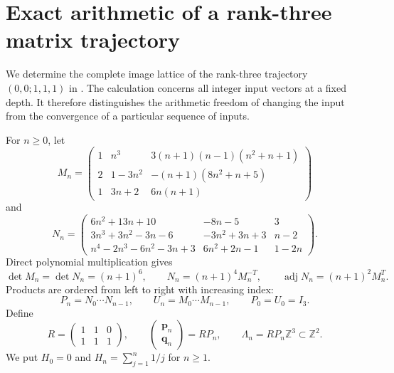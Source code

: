 \documentclass[11pt,a4paper]{article}
\theoremstyle{definition}
\theoremstyle{remark}
\newcommand{\Z}{\mathbb Z}
\numberwithin{equation}{section}
\begin{document}
\section{Exact arithmetic of a rank-three matrix trajectory}
\label{p7:sec:lattice}

We determine the complete image lattice of the rank-three trajectory
$(0,0;1,1,1)$ in \cite[Section~8.4]{p7:Kalisch2026}.  The calculation concerns
all integer input vectors at a fixed depth.  It therefore distinguishes
the arithmetic freedom of changing the input from the convergence of a
particular sequence of inputs.

For $n\geq0$, let
\begin{equation}\label{p7:eq:lat-M}
M_n=
\begin{pmatrix}
1&n^3&3(n+1)(n-1)(n^2+n+1)\\
2&1-3n^2&-(n+1)(8n^2+n+5)\\
1&3n+2&6n(n+1)
\end{pmatrix}
\end{equation}
and
\begin{equation}\label{p7:eq:lat-N}
N_n=
\begin{pmatrix}
6n^2+13n+10&-8n-5&3\\
3n^3+3n^2-3n-6&-3n^2+3n+3&n-2\\
n^4-2n^3-6n^2-3n+3&6n^2+2n-1&1-2n
\end{pmatrix}.
\end{equation}
Direct polynomial multiplication gives
\begin{equation}\label{p7:eq:lat-matrix-identities}
\det M_n=\det N_n=(n+1)^6,\qquad
N_n=(n+1)^4M_n^{-T},\qquad
\operatorname{adj}N_n=(n+1)^2M_n^T.
\end{equation}
Products are ordered from left to right with increasing index:
\[
P_n=N_0\cdots N_{n-1},\qquad
U_n=M_0\cdots M_{n-1},\qquad P_0=U_0=I_3.
\]
Define
\[
R=\begin{pmatrix}1&1&0\\1&1&1\end{pmatrix},\qquad
\begin{pmatrix}\mathbf p_n\\\mathbf q_n\end{pmatrix}=RP_n,
\qquad \Lambda_n=RP_n\Z^3\subset\Z^2.
\]
We put $H_0=0$ and $H_n=\sum_{j=1}^n1/j$ for $n\geq1$.
\end{document}
